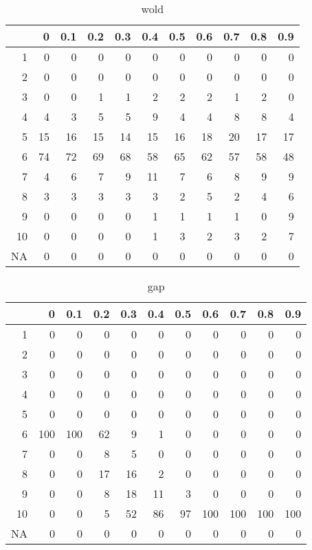 \documentclass[11pt]{article}
\begin{document}
\begin{table}[H]
\centering
\begin{tabular}{rrrrrrrrrrr}
  \hline
 & 0 & 0.1 & 0.2 & 0.3 & 0.4 & 0.5 & 0.6 & 0.7 & 0.8 & 0.9 \\ 
  \hline
1 & 0 & 0 & 0 & 0 & 0 & 0 & 0 & 0 & 0 & 0 \\ 
  2 & 0 & 0 & 0 & 0 & 0 & 0 & 0 & 0 & 0 & 0 \\ 
  3 & 0 & 0 & 1 & 1 & 2 & 2 & 2 & 1 & 2 & 0 \\ 
  4 & 4 & 3 & 5 & 5 & 9 & 4 & 4 & 8 & 8 & 4 \\ 
  5 & 15 & 16 & 15 & 14 & 15 & 16 & 18 & 20 & 17 & 17 \\ 
  6 & 74 & 72 & 69 & 68 & 58 & 65 & 62 & 57 & 58 & 48 \\ 
  7 & 4 & 6 & 7 & 9 & 11 & 7 & 6 & 8 & 9 & 9 \\ 
  8 & 3 & 3 & 3 & 3 & 3 & 2 & 5 & 2 & 4 & 6 \\ 
  9 & 0 & 0 & 0 & 0 & 1 & 1 & 1 & 1 & 0 & 9 \\ 
  10 & 0 & 0 & 0 & 0 & 1 & 3 & 2 & 3 & 2 & 7 \\ 
  NA & 0 & 0 & 0 & 0 & 0 & 0 & 0 & 0 & 0 & 0 \\ 
   \hline
\end{tabular}
\caption{wold} 
\end{table}
\begin{table}[H]
\centering
\begin{tabular}{rrrrrrrrrrr}
  \hline
 & 0 & 0.1 & 0.2 & 0.3 & 0.4 & 0.5 & 0.6 & 0.7 & 0.8 & 0.9 \\ 
  \hline
1 & 0 & 0 & 0 & 0 & 0 & 0 & 0 & 0 & 0 & 0 \\ 
  2 & 0 & 0 & 0 & 0 & 0 & 0 & 0 & 0 & 0 & 0 \\ 
  3 & 0 & 0 & 0 & 0 & 0 & 0 & 0 & 0 & 0 & 0 \\ 
  4 & 0 & 0 & 0 & 0 & 0 & 0 & 0 & 0 & 0 & 0 \\ 
  5 & 0 & 0 & 0 & 0 & 0 & 0 & 0 & 0 & 0 & 0 \\ 
  6 & 100 & 100 & 62 & 9 & 1 & 0 & 0 & 0 & 0 & 0 \\ 
  7 & 0 & 0 & 8 & 5 & 0 & 0 & 0 & 0 & 0 & 0 \\ 
  8 & 0 & 0 & 17 & 16 & 2 & 0 & 0 & 0 & 0 & 0 \\ 
  9 & 0 & 0 & 8 & 18 & 11 & 3 & 0 & 0 & 0 & 0 \\ 
  10 & 0 & 0 & 5 & 52 & 86 & 97 & 100 & 100 & 100 & 100 \\ 
  NA & 0 & 0 & 0 & 0 & 0 & 0 & 0 & 0 & 0 & 0 \\ 
   \hline
\end{tabular}
\caption{gap} 
\end{table}
\end{document}
